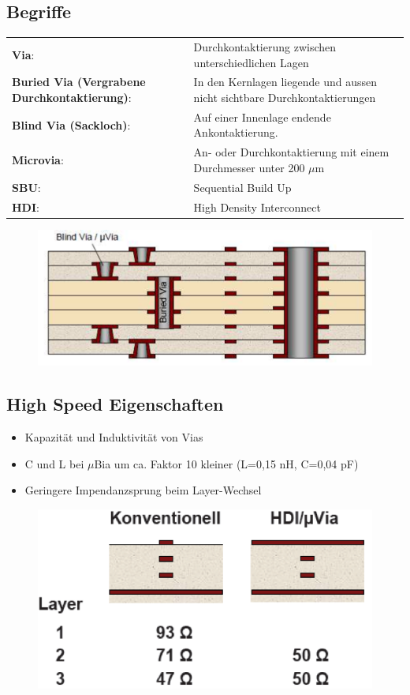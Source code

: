 \subsection{Begriffe}
\begin{tabular}{p{6cm}p{11cm}}
\textbf{Via}:& Durchkontaktierung zwischen unterschiedlichen Lagen\\
\textbf{Buried Via (Vergrabene Durchkontaktierung)}: &In den Kernlagen liegende
  und aussen nicht sichtbare Durchkontaktierungen\\
\textbf{Blind Via (Sackloch)}: &Auf einer Innenlage endende Ankontaktierung.\\
\textbf{Microvia}: &An- oder Durchkontaktierung  mit einem Durchmesser unter 200
  $\mu$m\\
\textbf{SBU}:&Sequential Build Up\\
\textbf{HDI}:&High Density Interconnect\\
\end{tabular}
\begin{figure}[htb]
\includegraphics[scale=0.4]{pictures/begriffe}
\end{figure}

\subsection{High Speed Eigenschaften}
\begin{itemize}
  \item Kapazität und Induktivität von Vias
  \item C und L bei $\mu$Bia um ca. Faktor 10 kleiner (L=0,15 nH, C=0,04 pF)
  \item Geringere Impendanzsprung beim Layer-Wechsel
\end{itemize}

\begin{figure}[htb]
\includegraphics[scale=0.4]{pictures/highspeed}
\end{figure}

